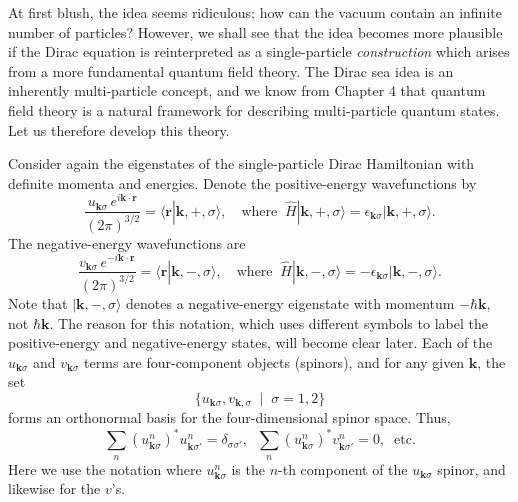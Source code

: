 \documentclass[prx,12pt]{revtex4-2}
\begin{document}
At first blush, the idea seems ridiculous; how can the vacuum contain
an infinite number of particles?  However, we shall see that the idea
becomes more plausible if the Dirac equation is reinterpreted as a
single-particle \textit{construction} which arises from a more
fundamental quantum field theory.  The Dirac sea idea is an inherently
multi-particle concept, and we know from Chapter 4 that quantum field
theory is a natural framework for describing multi-particle quantum
states.  Let us therefore develop this theory.

Consider again the eigenstates of the single-particle Dirac
Hamiltonian with definite momenta and energies.  Denote the
positive-energy wavefunctions by
\begin{equation}
  \frac{u_{\mathbf{k}\sigma} \, e^{i\mathbf{k}\cdot \mathbf{r}}}{(2\pi)^{3/2}}
  = \langle \mathbf{r} | \mathbf{k}, +, \sigma\rangle,
  \quad\mathrm{where}\;\;
  \hat{H} |\mathbf{k}, +, \sigma\rangle
  = \epsilon_{\mathbf{k}\sigma} |\mathbf{k}, +, \sigma\rangle.
  \label{Diraces1}
\end{equation}
The negative-energy wavefunctions are
\begin{equation}
  \frac{v_{\mathbf{k}\sigma} \, e^{-i\mathbf{k}\cdot \mathbf{r}}}{(2\pi)^{3/2}}
  = \langle \mathbf{r} | \mathbf{k}, -, \sigma\rangle,
  \quad\mathrm{where}\;\;
  \hat{H} |\mathbf{k}, -, \sigma\rangle
  = - \epsilon_{\mathbf{k}\sigma} |\mathbf{k}, -, \sigma\rangle.
  \label{Diraces2}
\end{equation}
Note that $|\mathbf{k}, -, \sigma\rangle$ denotes a negative-energy
eigenstate with momentum $-\hbar\mathbf{k}$, not $\hbar\mathbf{k}$.
The reason for this notation, which uses different symbols to label
the positive-energy and negative-energy states, will become clear
later.  Each of the $u_{\mathbf{k}\sigma}$ and $v_{\mathbf{k}\sigma}$
terms are four-component objects (spinors), and for any given
$\mathbf{k}$, the set
\begin{equation*}
  \{ u_{\mathbf{k}\sigma}, v_{\mathbf{k},\sigma}\;\;  | \;\; \sigma = 1,2  \}
\end{equation*}
forms an orthonormal basis for the four-dimensional spinor space.
Thus,
\begin{equation}
  \sum_{n} \left(u^n_{\mathbf{k}\sigma}\right)^* u^n_{\mathbf{k}\sigma'} = \delta_{\sigma\sigma'}, \;\;
  \sum_{n} \left(u^n_{\mathbf{k}\sigma}\right)^* v^n_{\mathbf{k}\sigma'} = 0, \;\;
  \textrm{etc.}
  \label{uvorthog}
\end{equation}
Here we use the notation where $u^n_{\mathbf{k}\sigma}$ is the $n$-th
component of the $u_{\mathbf{k}\sigma}$ spinor, and likewise for the
$v$'s.
\end{document}
